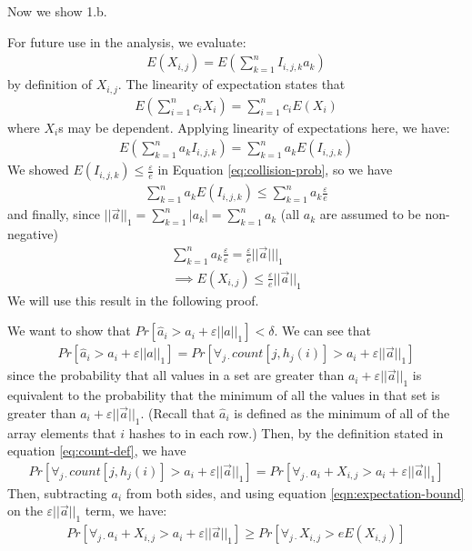 \documentclass[11pt]{article}
\begin{document}
Now we show 1.b.

For future use in the analysis, we evaluate:
\begin{align}
    E(X_{i, j}) = E\left(\sum_{k = 1}^n I_{i, j, k} a_k\right) 
\end{align}
by definition of $X_{i, j}$. The linearity of expectation states that
\begin{align}
    E(\sum_{i = 1}^{n} c_i X_i) = \sum_{i = 1}^{n} c_i E(X_i)
\end{align}
where $X_i$s may be dependent. Applying linearity of expectations here, we have:
\begin{align}
    E(\sum_{k = 1}^{n} a_k I_{i, j, k}) = \sum_{k = 1}^{n} a_k E(I_{i, j, k}) 
\end{align}
We showed $E(I_{i, j, k}) \leq \frac{\varepsilon}{e}$ in Equation \ref{eq:collision-prob}, so 
we have
\begin{align}
    \sum_{k = 1}^{n} a_k E(I_{i, j, k})  \leq\sum_{k = 1}^{n} a_k \frac{\varepsilon}{e}
\end{align}
and finally, since $||\vec{a}||_1 = \sum_{k = 1}^{n} |a_k| = \sum_{k = 1}^{n} a_k$
(all $a_k$ are assumed to be non-negative)
\begin{align}\label{eqn:expectation-bound}
    \sum_{k = 1}^{n} a_k \frac{\varepsilon}{e} = \frac{\varepsilon}{e} ||\vec{a}|||_1 \nonumber \\
    \implies E(X_{i, j}) \leq \frac{\varepsilon}{e} ||\vec{a}||_1 
\end{align}
We will use this result in the following proof.

We want to show that $Pr[\hat{a}_i > a_i + \varepsilon ||a||_1] < \delta$. We can see that
\begin{align}
    Pr[\hat{a}_i > a_i + \varepsilon ||a||_1] = Pr[\forall_{j \cdot} count[j, h_j(i)] > a_i + \varepsilon ||\vec{a}||_1 ]
\end{align}
since the probability that all values in a set are greater than $a_i + \varepsilon||\vec a||_1$ is equivalent 
to the probability that the minimum of all the values in that set is greater than $a_i + \varepsilon||\vec a||_1$.
(Recall that $\hat a_i$ is defined as the minimum of all of the array elements that $i$
hashes to in each row.) Then, by the definition stated in equation \ref{eq:count-def}, we have
\begin{align}
    Pr[\forall_{j \cdot} count[j, h_j(i)] > a_i + \varepsilon ||\vec{a}||_1] = Pr[\forall_{j \cdot} a_i + X_{i, j} > a_i + \varepsilon ||\vec{a}||_1]
\end{align}
Then, subtracting $a_i$ from both sides, and using equation \ref{eqn:expectation-bound} on the $\varepsilon ||\vec{a}||_1$ term, we have:
\begin{align}
    Pr[\forall_{j \cdot} a_i + X_{i, j} > a_i + \varepsilon ||\vec{a}||_1] \geq Pr[\forall_{j \cdot} X_{i, j} > e E(X_{i, j})]
\end{align}
\end{document}

